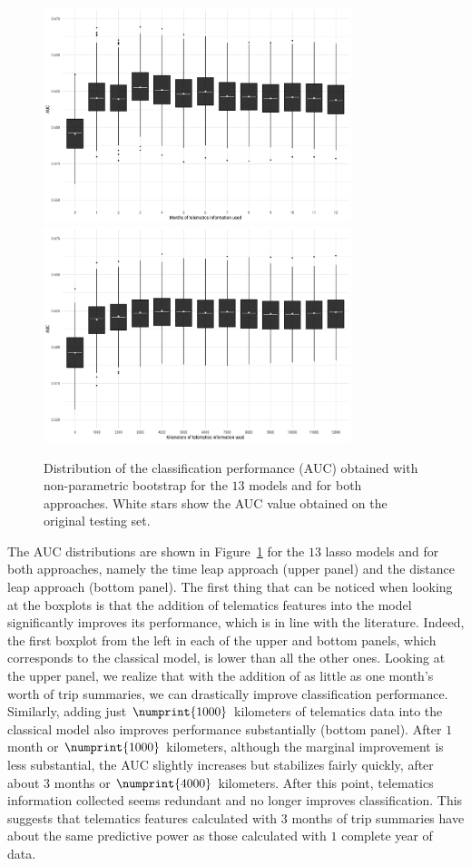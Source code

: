 \documentclass{article}
\begin{document}
\begin{figure}[ht]
    \centering
    \includegraphics[width=0.8\textwidth]{boxplot_bootstrap.png}
    \hfill
    \includegraphics[width=0.8\textwidth]{boxplot_bootstrap_km.png}
    \caption{Distribution of the classification performance (AUC) obtained with non-parametric bootstrap for the $13$ models and for both approaches. White stars show the AUC value obtained on the original testing set.}
    \label{fig:bootstrap_results}
\end{figure}
The AUC distributions are shown in Figure~\ref{fig:bootstrap_results} for the $13$ lasso models and for both approaches, namely the time leap approach (upper panel) and the distance leap approach (bottom panel). The first thing that can be noticed when looking at the boxplots is that the addition of telematics features into the model significantly improves its performance, which is in line with the literature. Indeed, the first boxplot from the left in each of the upper and bottom panels, which corresponds to the classical model, is lower than all the other ones. Looking at the upper panel, we realize that with the addition of as little as one month's worth of trip summaries, we can drastically improve classification performance. Similarly, adding just $\numprint{1000}$ kilometers of telematics data into the classical model also improves performance substantially (bottom panel). After $1$ month or $\numprint{1000}$ kilometers, although the marginal improvement is less substantial, the AUC slightly increases but stabilizes fairly quickly, after about $3$ months or $\numprint{4000}$ kilometers. After this point, telematics information collected seems redundant and no longer improves classification. This suggests that telematics features calculated with $3$ months of trip summaries have about the same predictive power as those calculated with $1$ complete year of data.
\end{document}
